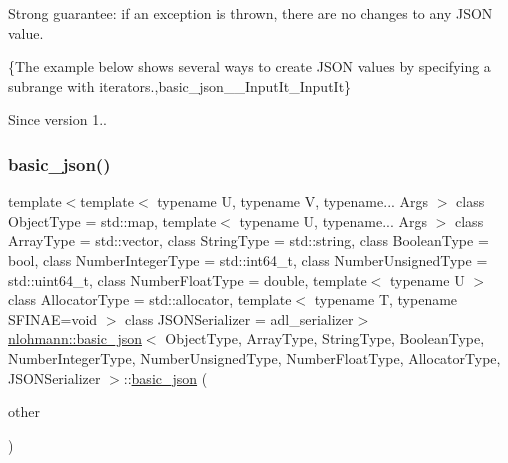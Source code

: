 Strong guarantee\+: if an exception is thrown, there are no changes to any J\+S\+ON value.

\{The example below shows several ways to create J\+S\+ON values by specifying a subrange with iterators.,basic\+\_\+json\+\_\+\+\_\+\+Input\+It\+\_\+\+Input\+It\}

\begin{DoxySince}{Since}
version 1.. 
\end{DoxySince}
\mbox{\label{classnlohmann_1_1basic__json_af5de621bcf646c332343f9c1e011126c}} 
\subsubsection{\texorpdfstring{basic\+\_\+json()}{basic\_json()}\hspace{0.1cm}{\footnotesize\ttfamily [7/8]}}
{\footnotesize\ttfamily template$<$template$<$ typename U, typename V, typename... Args $>$ class Object\+Type = std\+::map, template$<$ typename U, typename... Args $>$ class Array\+Type = std\+::vector, class String\+Type  = std\+::string, class Boolean\+Type  = bool, class Number\+Integer\+Type  = std\+::int64\+\_\+t, class Number\+Unsigned\+Type  = std\+::uint64\+\_\+t, class Number\+Float\+Type  = double, template$<$ typename U $>$ class Allocator\+Type = std\+::allocator, template$<$ typename T, typename S\+F\+I\+N\+A\+E=void $>$ class J\+S\+O\+N\+Serializer = adl\+\_\+serializer$>$ \\
\mbox{\hyperlink{classnlohmann_1_1basic__json}{nlohmann\+::basic\+\_\+json}}$<$ Object\+Type, Array\+Type, String\+Type, Boolean\+Type, Number\+Integer\+Type, Number\+Unsigned\+Type, Number\+Float\+Type, Allocator\+Type, J\+S\+O\+N\+Serializer $>$\+::\mbox{\hyperlink{classnlohmann_1_1basic__json}{basic\+\_\+json}} (\begin{DoxyParamCaption}\item[{const \mbox{\hyperlink{classnlohmann_1_1basic__json}{basic\+\_\+json}}$<$ Object\+Type, Array\+Type, String\+Type, Boolean\+Type, Number\+Integer\+Type, Number\+Unsigned\+Type, Number\+Float\+Type, Allocator\+Type, J\+S\+O\+N\+Serializer $>$ \&}]{other }\end{DoxyParamCaption})\hspace{0.3cm}{\ttfamily [inline]}}



